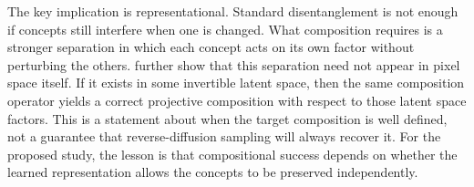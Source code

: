 The key implication is representational. 
Standard disentanglement is not enough if concepts still interfere when one is changed. What composition requires is a stronger separation in which each concept acts on its own factor without perturbing the others. 
\citet{mechanisms2025projective} further show that this separation need not appear in pixel space itself. 
If it exists in some invertible latent space, then the same composition operator yields a correct projective composition with respect to those latent space factors. 
This is a statement about when the target composition is well defined, not a guarantee that reverse-diffusion sampling will always recover it. 
For the proposed study, the lesson is that compositional success depends on whether the learned representation allows the concepts to be preserved independently.
